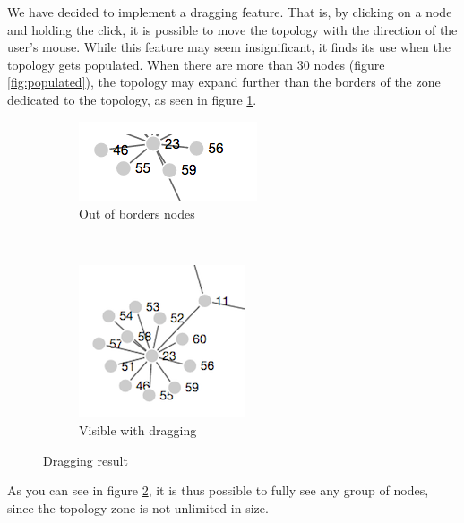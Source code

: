 We have decided to implement a dragging feature. That is, by clicking on a node and holding the click, it is possible to move the topology with the direction of the user's mouse. While this feature may seem insignificant, it finds its use when the topology gets populated. When there are more than 30 nodes (figure \ref{fig:populated}), the topology may expand further than the borders of the zone dedicated to the topology, as seen in figure \ref{fig:outnode}.\\



\begin{figure}
    \centering
    \begin{subfigure}[h]{0.3\textwidth}
        \includegraphics[width=\textwidth]{res/outnode.png}
        \caption{Out of borders nodes}
        \label{fig:outnode}
    \end{subfigure}
    ~
    \begin{subfigure}[h]{0.3\textwidth}
        \includegraphics[width=\textwidth]{res/visible.png}
        \caption{Visible with dragging}
        \label{fig:visible}
    \end{subfigure}
    \caption{Dragging result}\label{fig:dragging}
\end{figure}

As you can see in figure \ref{fig:visible}, it is thus possible to fully see any group of nodes, since the topology zone is not unlimited in size. \\
